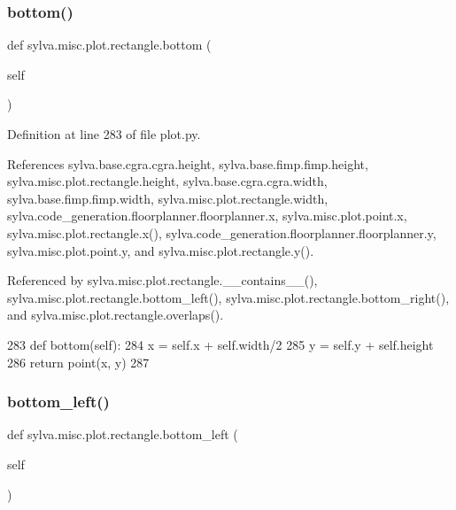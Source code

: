 \subsubsection{\texorpdfstring{bottom()}{bottom()}}
{\footnotesize\ttfamily def sylva.\+misc.\+plot.\+rectangle.\+bottom (\begin{DoxyParamCaption}\item[{}]{self }\end{DoxyParamCaption})}



Definition at line 283 of file plot.\+py.



References sylva.\+base.\+cgra.\+cgra.\+height, sylva.\+base.\+fimp.\+fimp.\+height, sylva.\+misc.\+plot.\+rectangle.\+height, sylva.\+base.\+cgra.\+cgra.\+width, sylva.\+base.\+fimp.\+fimp.\+width, sylva.\+misc.\+plot.\+rectangle.\+width, sylva.\+code\+\_\+generation.\+floorplanner.\+floorplanner.\+x, sylva.\+misc.\+plot.\+point.\+x, sylva.\+misc.\+plot.\+rectangle.\+x(), sylva.\+code\+\_\+generation.\+floorplanner.\+floorplanner.\+y, sylva.\+misc.\+plot.\+point.\+y, and sylva.\+misc.\+plot.\+rectangle.\+y().



Referenced by sylva.\+misc.\+plot.\+rectangle.\+\_\+\+\_\+contains\+\_\+\+\_\+(), sylva.\+misc.\+plot.\+rectangle.\+bottom\+\_\+left(), sylva.\+misc.\+plot.\+rectangle.\+bottom\+\_\+right(), and sylva.\+misc.\+plot.\+rectangle.\+overlaps().


\begin{DoxyCode}
283     \textcolor{keyword}{def }bottom(self):
284       x = self.x + self.width/2
285       y = self.y + self.height
286       \textcolor{keywordflow}{return} point(x, y)
287 
\end{DoxyCode}
\mbox{\label{classsylva_1_1misc_1_1plot_1_1rectangle_a7c8c635a0a782c8e304f7440b74d8066}} 
\subsubsection{\texorpdfstring{bottom\+\_\+left()}{bottom\_left()}}
{\footnotesize\ttfamily def sylva.\+misc.\+plot.\+rectangle.\+bottom\+\_\+left (\begin{DoxyParamCaption}\item[{}]{self }\end{DoxyParamCaption})}



